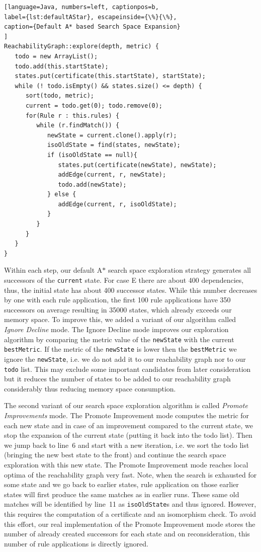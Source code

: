 \documentclass[submission,copyright,creativecommons]{eptcs}
\begin{document}
\begin{lstlisting}[language=Java, numbers=left, captionpos=b, 
label={lst:defaultAStar}, escapeinside={\%}{\%},
caption={Default A* based Search Space Expansion}
]
ReachabilityGraph::explore(depth, metric) {
   todo = new ArrayList();
   todo.add(this.startState);
   states.put(certificate(this.startState), startState);
   while (! todo.isEmpty() && states.size() <= depth) {
      sort(todo, metric);
      current = todo.get(0); todo.remove(0);
      for(Rule r : this.rules) {
         while (r.findMatch()) {
            newState = current.clone().apply(r);
            isoOldState = find(states, newState);
            if (isoOldState == null){
               states.put(certificate(newState), newState);
               addEdge(current, r, newState);
               todo.add(newState);
            } else {
               addEdge(current, r, isoOldState);
            }
         }
      }
   }
}
\end{lstlisting}


Within each step, our default A$*$ search space exploration strategy 
generates all successors of the 
\texttt{current} state. For case E there are about 400 dependencies, thus, 
the initial state has about 400 successor states. While this number decreases 
by one with each rule application, the first 100 rule applications  
have 350 successors on average resulting in 35000 states, which already exceeds our 
memory space. To improve this, we added a variant of our algorithm called 
\emph{Ignore Decline} mode.  The Ignore Decline mode improves our 
exploration algorithm by comparing the metric value of the \texttt{newState} with 
the current \texttt{bestMetric}. If the metric of the \texttt{newState} is lower 
then the \texttt{bestMetric} we ignore the \texttt{newState}, i.e. 
we do not add it to our reachability graph nor to our \texttt{todo} list. This 
may exclude some important candidates from later consideration but it reduces the 
number of states to be added to our reachability graph considerably thus reducing 
memory space consumption.   

The second variant of our search space exploration algorithm is called 
\emph{Promote Improvements} mode.  The Promote Improvement mode computes the metric 
for each new state and in case of an improvement compared to the current state, 
we stop the expansion of the current state (putting it back into the todo list). 
Then we jump back to line~6 and start with a new iteration, i.e. we sort the todo list 
(bringing the new best state to the front) and continue the search space exploration 
with this new state.
The Promote Improvement mode reaches  
local optima of the reachability graph very fast. 
Note, when the search is exhausted for some state and we go back to earlier
states, rule application on those earlier states will first produce the same
matches as in earlier runs. These same old matches will be identified by line~11
as \texttt{isoOldState}s and thus ignored. However, this requires the computation 
of a certificate and an isomorphism check. To avoid this effort, our real 
implementation of the Promote Improvement mode stores 
the number of already created successors
for each state and on reconsideration, this number of rule applications is directly 
ignored.  
\end{document}
